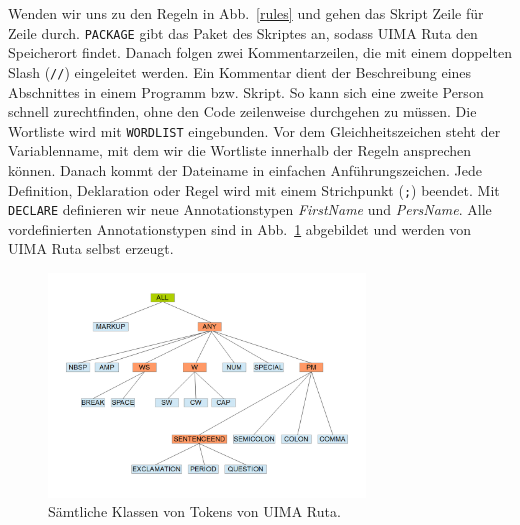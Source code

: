 \documentclass{article}
\begin{document}
Wenden wir uns zu den Regeln in Abb.~\ref{rules} und gehen das Skript Zeile für Zeile durch. \texttt{PACKAGE} gibt das Paket des Skriptes an, sodass UIMA Ruta den Speicherort findet. Danach folgen zwei Kommentarzeilen, die mit einem doppelten Slash (\texttt{//}) eingeleitet werden. Ein Kommentar dient der Beschreibung eines Abschnittes in einem Programm bzw. Skript. So kann sich eine zweite Person schnell zurechtfinden, ohne den Code zeilenweise durchgehen zu müssen. Die Wortliste wird mit \texttt{WORDLIST} eingebunden. Vor dem Gleichheitszeichen steht der Variablenname, mit dem wir die Wortliste innerhalb der Regeln ansprechen können. Danach kommt der Dateiname in einfachen Anführungszeichen. Jede Definition, Deklaration oder Regel wird mit einem Strichpunkt (\texttt{;}) beendet. Mit \texttt{DECLARE} definieren wir neue Annotationstypen \textit{FirstName} und \textit{PersName}. Alle vordefinierten Annotationstypen sind in Abb.~\ref{tokens} abgebildet und werden von UIMA Ruta selbst erzeugt.

\begin{figure}
\centering
\includegraphics[width=0.75\textwidth]{figs/basic_token.png}
\caption{Sämtliche Klassen von Tokens von UIMA Ruta.}
\label{tokens}
\end{figure}
\end{document}
